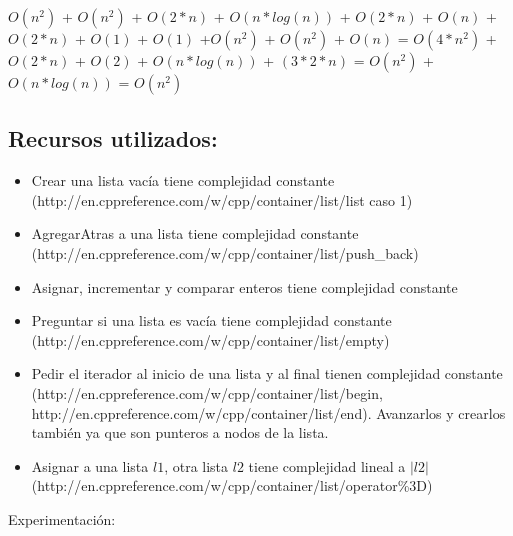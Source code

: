 \documentclass[a4paper]{article}
\begin{document}
$O(n^{2})$ + $O(n^{2})$ + $O(2*n)$ + $O(n*log(n))$ + $O(2*n)$ + $O(n)$ + $O(2*n)$ + $O(1)$ + $O(1)$ +$O(n^{2})$ + $O(n^{2})$ + $O(n)$  = $O(4*n^{2})$ + $O(2*n)$ + $O(2)$ + $O(n*log(n))$ + $(3*2*n)$ = $O(n^{2})$ + $O(n*log(n))$ =  $O(n^{2})$
\newline\newline

\subsection{Recursos utilizados:}
\begin{itemize}
\item Crear una lista vacía tiene complejidad constante \newline (http://en.cppreference.com/w/cpp/container/list/list caso 1)
\item AgregarAtras a una lista tiene complejidad constante 
\newline (http://en.cppreference.com/w/cpp/container/list/push\_back)
\item Asignar, incrementar y comparar enteros tiene complejidad constante
\item Preguntar si una lista es vacía tiene complejidad constante \newline (http://en.cppreference.com/w/cpp/container/list/empty)
\item Pedir el iterador al inicio de una lista y al final tienen complejidad constante \newline (http://en.cppreference.com/w/cpp/container/list/begin, http://en.cppreference.com/w/cpp/container/list/end). Avanzarlos y crearlos también ya que son punteros a nodos de la lista. 
\item Asignar a una lista $l1$, otra lista $l2$ tiene complejidad lineal a $|l2|$ \newline (http://en.cppreference.com/w/cpp/container/list/operator\%3D)
\end{itemize}

{\noindent \Huge Experimentación:}
\newline \newline
\end{document}
